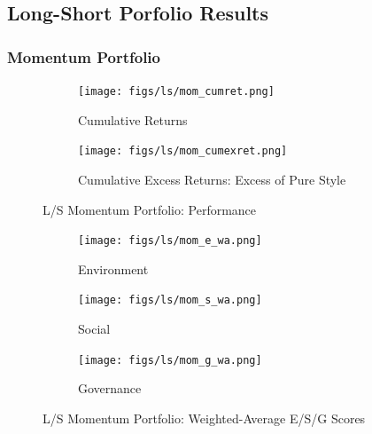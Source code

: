 \documentclass[11pt,a4paper]{article}
\begin{document}
\clearpage

\subsection{Long-Short Porfolio Results}\label{appendix:ls_ptf_res}

\subsubsection{Momentum Portfolio}

\begin{figure}[h!]
    \centering
    \begin{subfigure}{.5\textwidth}
        \centering
        \texttt{[image: figs/ls/mom\_cumret.png]}
        \caption{Cumulative Returns}
        \label{fig:mom_cumret}
    \end{subfigure}%
    \begin{subfigure}{.5\textwidth}
      \centering
      \texttt{[image: figs/ls/mom\_cumexret.png]}
      \caption{Cumulative Excess Returns: Excess of Pure Style}
      \label{fig:mom_cumexret}
    \end{subfigure}
    \caption{L/S Momentum Portfolio: Performance}
\end{figure}

\begin{figure}[h!]
    \centering
    \begin{subfigure}{.33\textwidth}
        \centering
        \texttt{[image: figs/ls/mom\_e\_wa.png]}
        \caption{Environment}
        \label{fig:mom_e_wa}
    \end{subfigure}%
    \begin{subfigure}{.33\textwidth}
      \centering
      \texttt{[image: figs/ls/mom\_s\_wa.png]}
      \caption{Social}
      \label{fig:mom_s_wa}
    \end{subfigure}%
    \begin{subfigure}{.33\textwidth}
        \centering
        \texttt{[image: figs/ls/mom\_g\_wa.png]}
        \caption{Governance}
        \label{fig:mom_g_wa}
      \end{subfigure}
    \caption{L/S Momentum Portfolio: Weighted-Average E/S/G Scores}
\end{figure}

\begin{center}
    
    \label{tab:mom_stats}
\end{center}
\end{document}
